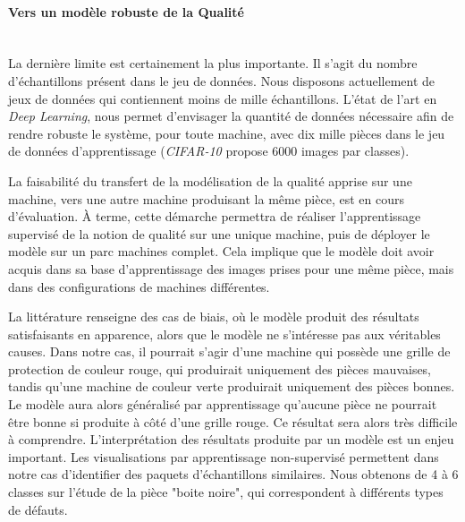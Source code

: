 \paragraph{Vers un modèle robuste de la Qualité} \mbox{} \\
La dernière limite est certainement la plus importante.
Il s'agit du nombre d'échantillons présent dans le jeu de données.
Nous disposons actuellement de jeux de données qui contiennent moins de mille échantillons.
L’état de l’art en \textit{Deep Learning}, nous permet d’envisager la quantité de données nécessaire afin de rendre robuste le système, pour toute machine, avec dix mille pièces dans le jeu de données d’apprentissage (\textit{CIFAR-10} \cite{krizhevsky2009learning} propose 6000 images par classes).

La faisabilité du transfert de la modélisation de la qualité apprise sur une machine, vers une autre machine produisant la même pièce, est en cours d’évaluation.
À terme, cette démarche permettra de réaliser l’apprentissage supervisé de la notion de qualité sur une unique machine, puis de déployer le modèle sur un parc machines complet.
Cela implique que le modèle doit avoir acquis dans sa base d’apprentissage des images prises pour une même pièce, mais dans des configurations de machines différentes.

La littérature renseigne des cas de biais, où le modèle produit des résultats satisfaisants en apparence, alors que le modèle ne s’intéresse pas aux véritables causes.
Dans notre cas, il pourrait s'agir d'une machine qui possède une grille de protection de couleur rouge, qui produirait uniquement des pièces mauvaises, tandis qu’une machine de couleur verte produirait uniquement des pièces bonnes.
Le modèle aura alors généralisé par apprentissage qu’aucune pièce ne pourrait être bonne si produite à côté d’une grille rouge.
Ce résultat sera alors très difficile à comprendre.
L'interprétation des résultats produite par un modèle est un enjeu important.
Les visualisations par apprentissage non-supervisé permettent dans notre cas d'identifier des paquets d'échantillons similaires.
Nous obtenons de 4 à 6 classes sur l'étude de la pièce "boite noire", qui correspondent à différents types de défauts.


